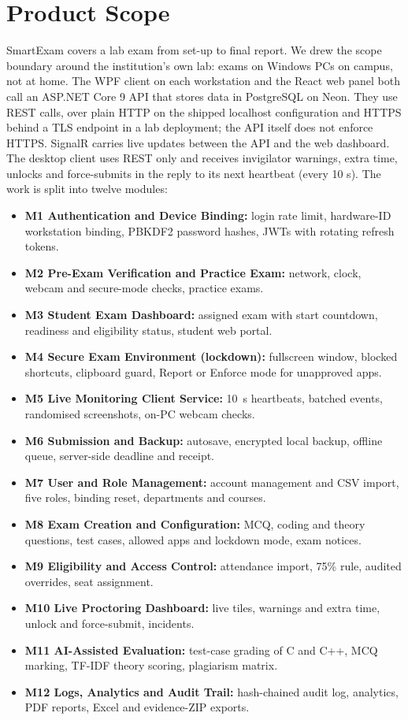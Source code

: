 \section{Product Scope}

SmartExam covers a lab exam from set-up to final report. We drew the scope boundary \cite[ch.~5]{pmbok6} around the institution's own lab: exams on Windows PCs on campus, not at home. The WPF client on each workstation and the React web panel both call an ASP.NET Core 9 API that stores data in PostgreSQL on Neon. They use REST calls, over plain HTTP on the shipped localhost configuration and HTTPS behind a TLS endpoint in a lab deployment; the API itself does not enforce HTTPS. SignalR carries live updates between the API and the web dashboard. The desktop client uses REST only and receives invigilator warnings, extra time, unlocks and force-submits in the reply to its next heartbeat (every 10 s). The work is split into twelve modules:

\begin{itemize}[noitemsep]
\item \textbf{M1 Authentication and Device Binding:} login rate limit, hardware-ID workstation binding, PBKDF2 password hashes, JWTs with rotating refresh tokens.
\item \textbf{M2 Pre-Exam Verification and Practice Exam:} network, clock, webcam and secure-mode checks, practice exams.
\item \textbf{M3 Student Exam Dashboard:} assigned exam with start countdown, readiness and eligibility status, student web portal.
\item \textbf{M4 Secure Exam Environment (lockdown):} fullscreen window, blocked shortcuts, clipboard guard, Report or Enforce mode for unapproved apps.
\item \textbf{M5 Live Monitoring Client Service:} 10~s heartbeats, batched events, randomised screenshots, on-PC webcam checks.
\item \textbf{M6 Submission and Backup:} autosave, encrypted local backup, offline queue, server-side deadline and receipt.
\item \textbf{M7 User and Role Management:} account management and CSV import, five roles, binding reset, departments and courses.
\item \textbf{M8 Exam Creation and Configuration:} MCQ, coding and theory questions, test cases, allowed apps and lockdown mode, exam notices.
\item \textbf{M9 Eligibility and Access Control:} attendance import, 75\% rule, audited overrides, seat assignment.
\item \textbf{M10 Live Proctoring Dashboard:} live tiles, warnings and extra time, unlock and force-submit, incidents.
\item \textbf{M11 AI-Assisted Evaluation:} test-case grading of C and C++, MCQ marking, TF-IDF theory scoring, plagiarism matrix.
\item \textbf{M12 Logs, Analytics and Audit Trail:} hash-chained audit log, analytics, PDF reports, Excel and evidence-ZIP exports.
\end{itemize}

